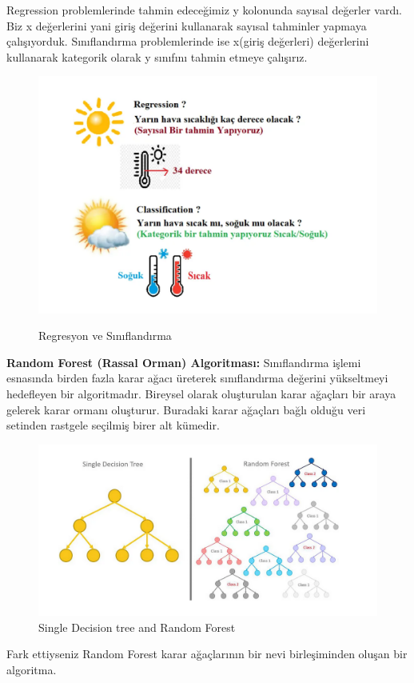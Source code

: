 \documentclass[12pt, a4paper]{article}
\begin{document}
	
	Regression problemlerinde tahmin edeceğimiz y kolonunda sayısal değerler vardı. Biz x değerlerini yani giriş değerini kullanarak sayısal tahminler yapmaya çalışıyorduk. Sınıflandırma problemlerinde ise x(giriş değerleri) değerlerini kullanarak kategorik olarak y sınıfını tahmin etmeye çalışırız.\cite{site3}
	
	
	
	\begin{figure}[!htbp] 
		\caption{ Regresyon ve Sınıflandırma  }
		\centering
		\includegraphics[angle=0, width=\textwidth]{resim4.png}
		\label{dogruluk}
	\end{figure} 
	
	
	\newpage \textbf{Random Forest (Rassal Orman) Algoritması:} 
	Sınıflandırma işlemi esnasında birden fazla karar ağacı üreterek sınıflandırma değerini yükseltmeyi hedefleyen bir algoritmadır. Bireysel olarak oluşturulan karar ağaçları bir araya gelerek karar ormanı oluşturur. Buradaki karar ağaçları bağlı olduğu veri setinden rastgele seçilmiş birer alt kümedir.
	\begin{figure}[!htbp] 
		\caption{ Single Decision tree and Random Forest }
		\centering
		\includegraphics[angle=0, width=\textwidth]{resim5.png}
		
	\end{figure} \newline
	Fark ettiyseniz Random Forest karar ağaçlarının bir nevi birleşiminden oluşan bir algoritma.\cite{site4}
	\newpage
	
\end{document}
